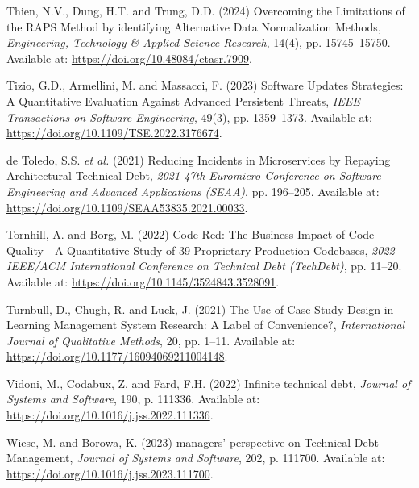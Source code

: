 \documentclass[
  12pt,
  letterpaper,
  12pt,
  oneside,
  english,
  onehalfspacing,
  headsepline]{MastersDoctoralThesis}
\newlength{\cslhangindent}
\newenvironment{CSLReferences}[2] %
 {\begin{list}{}{%
  \setlength{\itemindent}{0pt}
  \setlength{\leftmargin}{0pt}
  \setlength{\parsep}{0pt}
  \ifodd #1
   \setlength{\leftmargin}{\cslhangindent}
   \setlength{\itemindent}{-1\cslhangindent}
  \fi
  \setlength{\itemsep}{#2\baselineskip}}}
 {\end{list}}
\begin{document}
\begin{CSLReferences}{0}{1}
Thien, N.V., Dung, H.T. and Trung, D.D. (2024)
\textquotesingle Overcoming the {Limitations} of the {RAPS Method} by
identifying {Alternative Data Normalization Methods}\textquotesingle,
\emph{Engineering, Technology \& Applied Science Research}, 14(4), pp.
15745--15750. Available at: \url{https://doi.org/10.48084/etasr.7909}.

Tizio, G.D., Armellini, M. and Massacci, F. (2023)
\textquotesingle Software {Updates Strategies}: {A Quantitative
Evaluation Against Advanced Persistent Threats}\textquotesingle,
\emph{IEEE Transactions on Software Engineering}, 49(3), pp. 1359--1373.
Available at: \url{https://doi.org/10.1109/TSE.2022.3176674}.

de Toledo, S.S. \emph{et al.} (2021) \textquotesingle Reducing
{Incidents} in {Microservices} by {Repaying Architectural Technical
Debt}\textquotesingle, \emph{2021 47th {Euromicro Conference} on
{Software Engineering} and {Advanced Applications} ({SEAA})}, pp.
196--205. Available at:
\url{https://doi.org/10.1109/SEAA53835.2021.00033}.

Tornhill, A. and Borg, M. (2022) \textquotesingle Code {Red}: {The
Business Impact} of {Code Quality} - {A Quantitative Study} of 39
{Proprietary Production Codebases}\textquotesingle, \emph{2022
{IEEE}/{ACM International Conference} on {Technical Debt} ({TechDebt})},
pp. 11--20. Available at: \url{https://doi.org/10.1145/3524843.3528091}.

Turnbull, D., Chugh, R. and Luck, J. (2021) \textquotesingle The {Use}
of {Case Study Design} in {Learning Management System Research}: {A
Label} of {Convenience}?\textquotesingle, \emph{International Journal of
Qualitative Methods}, 20, pp. 1--11. Available at:
\url{https://doi.org/10.1177/16094069211004148}.

Vidoni, M., Codabux, Z. and Fard, F.H. (2022) \textquotesingle Infinite
technical debt\textquotesingle, \emph{Journal of Systems and Software},
190, p. 111336. Available at:
\url{https://doi.org/10.1016/j.jss.2022.111336}.

Wiese, M. and Borowa, K. (2023)  managers'
perspective on {Technical Debt Management}\textquotesingle,
\emph{Journal of Systems and Software}, 202, p. 111700. Available at:
\url{https://doi.org/10.1016/j.jss.2023.111700}.


\end{CSLReferences}
\end{document}
